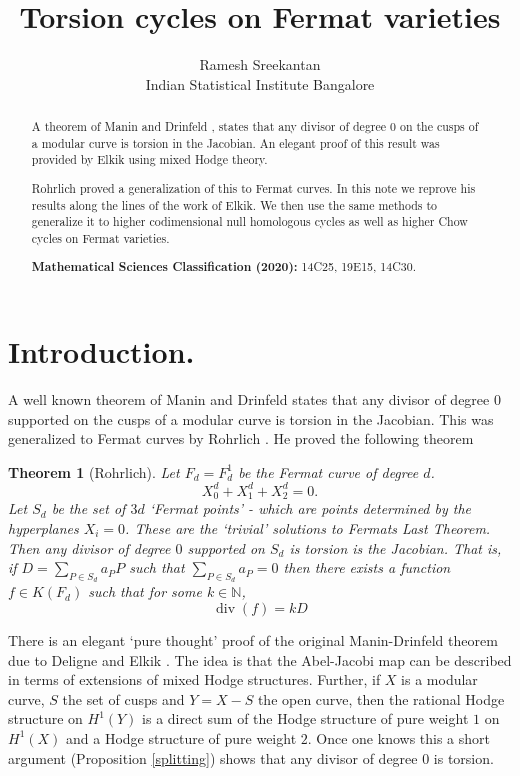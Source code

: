 \documentclass[12pt,reqno]{article}
\title{Torsion cycles on Fermat varieties}
\author{Ramesh Sreekantan\\Indian Statistical Institute Bangalore}
\newtheorem{thm}[defn]{Theorem}
\def\div{\operatorname{div}}
\begin{document}
	\baselineskip=17pt
	\maketitle
	
	\begin{abstract}
		
		A theorem of Manin and Drinfeld \cite{madr},\cite{drin} states that any divisor of degree $0$ on the cusps of a modular curve is torsion in the Jacobian. An elegant proof of this result was provided by Elkik \cite{elki} using mixed Hodge theory. 
		
		Rohrlich \cite{rohr} proved a generalization of this to Fermat curves. In this note we reprove his results along the lines of the work of Elkik. We then use the same methods to generalize it to higher codimensional null homologous cycles as well as higher Chow cycles on Fermat varieties. 
		
		\vspace{\baselineskip}
		{\bf Mathematical Sciences Classification (2020):} 14C25, 19E15, 14C30.
		
		
		
	\end{abstract}
	
	
	
	
	\section{Introduction.}
	
	A well known theorem of Manin and Drinfeld  \cite{madr,drin} states that any divisor of degree $0$ supported on the cusps of a modular curve is torsion in the Jacobian. This was generalized to Fermat curves by   Rohrlich \cite{rohr}. He proved the following theorem 
	
	\begin{thm}[Rohrlich] Let $F_d=F_d^1$  be the Fermat curve of degree $d$. 
		$$	X_0^d+X_1^d+X_2^d=0.$$
		Let $S_d$ be the set of $3d$ `Fermat points' - which are points determined by the hyperplanes $X_i=0$. These are the `trivial' solutions to Fermats Last Theorem. Then any divisor of degree $0$ supported on $S_d$ is torsion is the Jacobian. That is, if $D=\sum_{P \in S_d} a_P P$ such that $\sum_{P \in S_d} a_P=0$ then there exists a function $f \in K(F_d)$ such that for some $k \in {\mathds N}$,
		$$\div(f)=kD$$
	\end{thm}
	
	There is an elegant `pure thought' proof of the original Manin-Drinfeld theorem due to Deligne and Elkik \cite{elki}. The idea is that the Abel-Jacobi map can be described in terms of extensions of mixed Hodge structures. Further, if $X$ is a modular curve, $S$ the set of cusps and $Y=X- S$ the open curve, then the rational Hodge structure on $H^1(Y)$ is a direct sum of the Hodge structure of pure weight $1$ on $H^1(X)$ and a Hodge structure of pure weight $2$. Once one knows this a short argument (Proposition \ref{splitting}) shows that any divisor of degree $0$ is torsion. 
	
\end{document}

